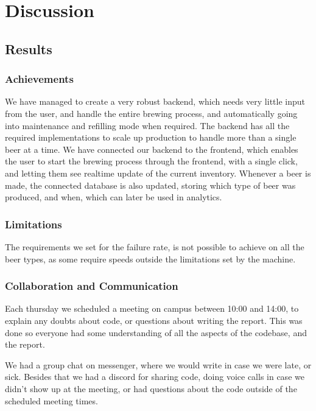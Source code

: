 \section{Discussion}

\subsection{Results}
\subsubsection{Achievements}
We have managed to create a very robust backend, which needs very little input from the user, and handle the entire brewing process, 
and automatically going into maintenance and refilling mode when required.
The backend has all the required implementations to scale up production to handle more than a single beer at a time.
We have connected our backend to the frontend, which enables the user to start the brewing process through the frontend, 
with a single click, and letting them see realtime update of the current inventory.
Whenever a beer is made, the connected database is also updated, storing which type of beer was produced, and when, which can later be used in analytics.

\subsubsection{Limitations}
The requirements we set for the failure rate,
is not possible to achieve on all the beer types,
as some require speeds outside the limitations set by the machine.

\subsubsection{Collaboration and Communication}
Each thursday we scheduled a meeting on campus between 10:00 and 14:00,
to explain any doubts about code, or questions about writing the report.
This was done so everyone had some understanding of all the aspects 
of the codebase, and the report.


We had a group chat on messenger, where we would write in case we were late,
or sick.
Besides that we had a discord for sharing code, doing voice calls in case 
we didn't show up at the meeting, or had questions about the code 
outside of the scheduled meeting times.

